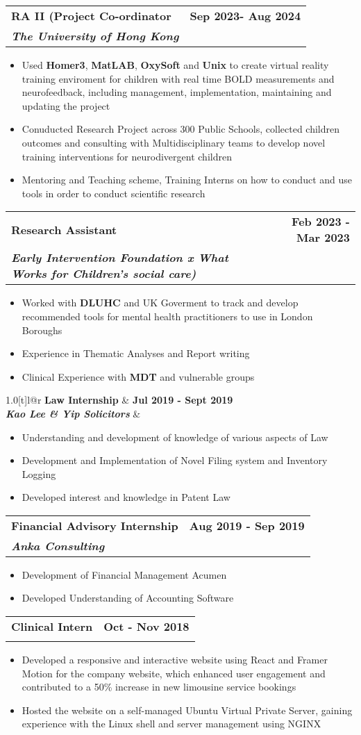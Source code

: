 \documentclass[a4paper,11pt]{article}
\makeatletter
\newcommand{\resumeItem}[1]{
  \item\small{
    {#1 \vspace{-2pt}}
  }
}
\newcommand{\resumeSubheading}[4]{
  \vspace{-2pt}\item
    \begin{tabular*}{1.0\textwidth}[t]{l@{\extracolsep{\fill}}r}
      \textbf{#1} & \textbf{\small #2} \\
      \textbf{\textit{\small #3}} & \textit{\small #4} \\
    \end{tabular*}\vspace{-7pt}
}
\newcommand{\resumeItemListStart}{\begin{itemize}}
\newcommand{\resumeItemListEnd}{\end{itemize}\vspace{-5pt}}
\makeatother
\begin{document}
\resumeSubheading
{RA II (Project Co-ordinator}{Sep 2023- Aug 2024}
{The University of Hong Kong}{}
\resumeItemListStart
\resumeItem{Used \textbf{Homer3}, \textbf{MatLAB}, \textbf{OxySoft} and \textbf{Unix} to create virtual reality training enviroment for children with real time BOLD measurements and neurofeedback, including management, implementation, maintaining and updating the project }
\resumeItem{Conuducted Research Project across 300 Public Schools, collected children outcomes and consulting with Multidisciplinary teams to develop novel training interventions for neurodivergent children}
\resumeItem{Mentoring and Teaching scheme, Training Interns on how to conduct and use tools in order to conduct scientific research}
\resumeItemListEnd

\resumeSubheading
{Research Assistant}{Feb 2023 - Mar 2023}
{Early Intervention Foundation x What Works for Children's social care) \href{https://www.eif.org.uk/report/evaluating-systemic-practice-within-the-supporting-families-programme}{\scalebox{0.75}\faLink}}{}
\resumeItemListStart
\resumeItem{ Worked with \textbf{DLUHC} and UK Goverment to track and develop recommended tools for mental health practitioners to use in London Boroughs}
\resumeItem{Experience in Thematic Analyses and Report writing }
\resumeItem{Clinical Experience with \textbf{MDT} and vulnerable groups}
\resumeItemListEnd

\resumeSubheading
{Law Internship}{Jul 2019 - Sept 2019}
{Kao Lee & Yip Solicitors}{}
\resumeItemListStart
\resumeItem{Understanding and development of knowledge of various aspects of Law}
\resumeItem{Development and Implementation of Novel Filing system and Inventory Logging}
\resumeItem{Developed interest and knowledge in Patent Law}
\resumeItemListEnd

\resumeSubheading
{Financial Advisory Internship}{Aug 2019 - Sep 2019}
{Anka Consulting}{}
\resumeItemListStart
\resumeItem{Development of Financial Management Acumen}
\resumeItem{Developed Understanding of Accounting Software}
\resumeItemListEnd

\resumeSubheading
{Clinical Intern}{Oct - Nov 2018}
{}{}
\resumeItemListStart
\resumeItem{Developed a responsive and interactive website using React and Framer Motion for the company website, which enhanced user engagement and contributed to a 50\% increase in new limousine service bookings}
\resumeItem{Hosted the website on a self-managed Ubuntu Virtual Private Server, gaining experience with the Linux shell and server management using NGINX}
\resumeItemListEnd
\end{document}
